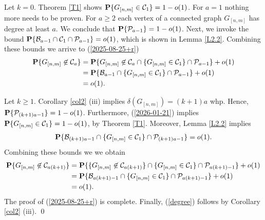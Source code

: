 \documentclass[11pt, a4paper]{article}
\newcommand{\PP}{{\bf{P}}}
\begin{document}
Let $k=0$.  Theorem \ref{T1}  shows
$\PP\{G_{[n,m]}\in {\cal C}_1\}=1-o(1)$. For $a=1$ nothing more needs to be proven.
For $a\ge 2$
each vertex of a  connected graph $G_{[n,m]}$  
has degree at least $a$. We conclude 
that $\PP\{{\cal P}_{a-1}\}=1-o(1)$. Next, we invoke the bound
$\PP\{{\cal B}_{a-1}\cap {\cal C}_1\cap{\cal P}_{a-1}\}=o(1)$,
 which is shown in   Lemma \ref{L2.2}. Combining these bounds we arrive to
  (\ref{2025-08-25+r})
\begin{align*}
\PP\{G_{[n,m]}\not\in {\cal C}_{a}\}
&
=
\PP\{G_{[n,m]}\not\in {\cal C}_{a}\cap \{G_{[n,m]}\in {\cal C}_1\}
\cap{\cal P}_{a-1}\}+o(1)
\\
&
=
\PP\{{\cal B}_{a-1}\cap \{G_{[n,m]}\in {\cal C}_1\}\cap{\cal P}_{a-1}\}
+
o(1)
\\
&
=
o(1).
\end{align*}




Let $k\ge 1$. Corollary \ref{col2} (iii) implies  
$\delta(G_{[n,m]})= (k+1)a$ whp.
Hence, $\PP\{{\cal P}_{(k+1)a-1}\}=1-o(1)$. 
Furthermore,  (\ref{2026-01-21}) implies
$\PP\{G_{[n,m]}\in {\cal C}_1\}=1-o(1)$, 
by Theorem \ref{T1}. Moreover,
Lemma \ref{L2.2} implies  
\begin{align*}
\PP\{
{\cal B}_{(k+1)a-1}
\cap \{G_{[n,m]}\in {\cal C}_1\}
\cap{\cal P}_{(k+1)a-1}
\}
=
o(1).
\end{align*}
Combining these bounds we 
we obtain
\begin{align*}
\PP\{G_{[n,m]}\not\in {\cal C}_{a(k+1)}\}
&
=
\PP\{\{G_{[n,m]}\not\in {\cal C}_{a(k+1)}\}
\cap 
\{G_{[n,m]}\in {\cal C}_1\}
\cap{\cal P}_{a(k+1)-1}\}+o(1)
\\
&
=
\PP\{{\cal B}_{a(k+1)-1}
\cap 
\{G_{[n,m]}\in {\cal C}_1\}
\cap
{\cal P}_{a(k+1)-1}\}
+
o(1)
\\
&
=
o(1).
\end{align*}  
The proof of  (\ref{2025-08-25+r}) is complete.
%
Finally,   (\ref{degree}) follows by  Corollary \ref{col2} (iii).
\qed
\end{document}

